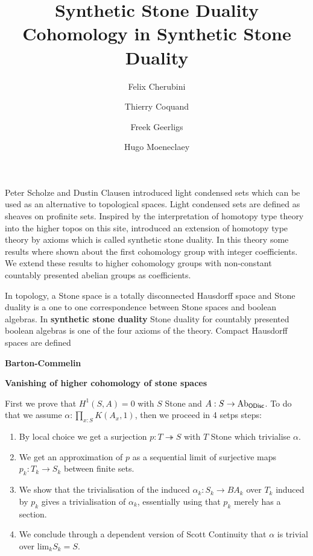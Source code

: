 \documentclass{../util/zariski}
\title{Synthetic Stone Duality 
}
\author{
Felix Cherubini %
\and 
 Thierry Coquand%
\and 
 Freek Geerligs%
\and
 Hugo Moeneclaey %
}
\title{Cohomology in Synthetic Stone Duality}
\begin{document}
\maketitle
Peter Scholze and Dustin Clausen \cite{Scholze} introduced light condensed sets which can be used as an alternative to topological spaces. Light condensed sets are defined as sheaves on profinite sets.
Inspired by the interpretation of homotopy type theory into the higher topos on this site, \cite{synthetic-stone-duality} introduced an extension of homotopy type theory by axioms which is called synthetic stone duality. In this theory some results where shown about the first cohomology group with integer coefficients. We extend these results to higher cohomology groups with non-constant countably presented abelian groups as coefficients.

In topology, a Stone space is a totally disconnected Hausdorff space and Stone duality is a one to one correspondence between Stone spaces and boolean algebras. In \textbf{synthetic stone duality} Stone duality for countably presented boolean algebras is one of the four axioms of the theory. Compact Hausdorff spaces are defined 

\textbf{Barton-Commelin}

\textbf{Vanishing of higher cohomology of stone spaces}

First we prove that $H^1(S,A) = 0$ with $S$ Stone and  $A : S\to \mathrm{Ab}_{\mathsf{ODisc}}$. To do that we assume $\alpha:\prod_{x:S}K(A_x,1)$, then we proceed in 4 setps steps:
\begin{enumerate}[(1)]
\item By local choice we get a surjection $p:T\twoheadrightarrow S$ with $T$ Stone which trivialise $\alpha$.
\item We get an approximation of $p$ as a sequential limit of surjective maps $p_k:T_k\to S_k$ between finite sets.
\item We show that the trivialisation of the induced $\alpha_k:S_k\to BA_k$ over $T_k$ induced by $p_k$ gives a trivialisation of $\alpha_k$, essentially using that $p_k$ merely has a section.
\item We conclude through a dependent version of Scott Continuity that $\alpha$ is trivial over $\mathrm{lim}_kS_k =S$.
\end{enumerate}
\end{document}
